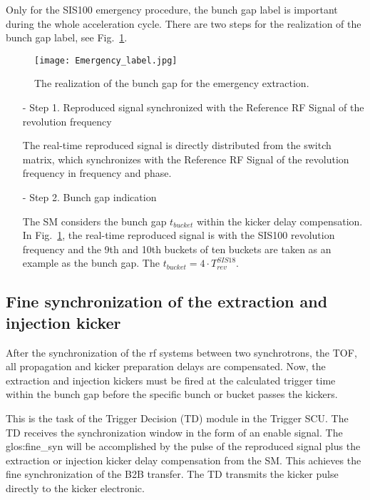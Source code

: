 \begin{itemize}
Only for the SIS100 emergency procedure, the bunch gap label is important during the whole acceleration cycle. There are two steps for the realization of the bunch gap label, see Fig.~\ref{Emergency_label}.
\begin{figure}[!htb]
   \centering   
   \texttt{[image: Emergency\_label.jpg]}
   \caption{The realization of the bunch gap for the emergency extraction.}
   \label{Emergency_label}
\end{figure} 

\begin{itemize}
\item[-] Step 1. Reproduced signal synchronized with the Reference RF Signal of the revolution frequency

The real-time reproduced signal is directly distributed from the switch matrix, which synchronizes with the Reference RF Signal of the revolution frequency in frequency and phase.
\item[-] Step 2. Bunch gap indication

The SM considers the bunch gap $t_{\mathit{bucket}}$ within the kicker delay compensation. In Fig.~\ref{Emergency_label}, the real-time reproduced signal is with the SIS100 revolution frequency and the 9th and 10th buckets of ten buckets are taken as an example as the bunch gap. The $t_{\mathit{bucket}}=4\cdot T_{\mathit{rev}}^{\mathit{SIS18}}$.

\end{itemize}

\end{itemize}

\subsection{Fine synchronization of the extraction and injection kicker}
After the synchronization of the rf systems between two synchrotrons, the TOF, all propagation and kicker preparation delays are compensated. Now, the extraction and injection kickers must be fired at the calculated trigger time within the bunch gap before the specific bunch or bucket passes the kickers.
 
This is the task of the Trigger Decision (TD) module in the Trigger SCU. The TD receives the  synchronization window in the form of an enable signal. The \gls{glos:fine_syn} will be accomplished by the pulse of the reproduced signal plus the extraction or injection kicker delay compensation from the SM. This achieves the fine synchronization of the B2B transfer. The TD transmits the kicker pulse directly to the kicker electronic.  
 
